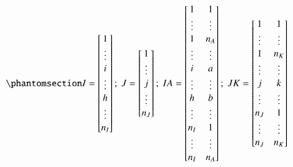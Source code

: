 \documentclass[
  authoryear,
  review,
  1p]{elsarticle}
\begin{document}
\begin{equation}\phantomsection\label{eq-mat11}{
I = \begin{bmatrix}
1 \\
\vdots \\
i \\
\vdots \\
h \\
\vdots \\
n_{I}
\end{bmatrix} ; \;
J = \begin{bmatrix}
1 \\
\vdots \\
j \\
\vdots \\
n_{J}
\end{bmatrix} ; \;
IA = \begin{bmatrix}
1 & 1 \\
\vdots & \vdots \\
1 & n_{A} \\
\vdots & \vdots \\
i & a \\
\vdots & \vdots \\
h & b \\
\vdots & \vdots \\
n_{I} & 1 \\
\vdots & \vdots \\
n_{I} & n_{A}
\end{bmatrix} ; \;
JK = \begin{bmatrix}
1 & 1 \\
\vdots & \vdots \\
1 & n_{K} \\
\vdots & \vdots \\
j & k \\
\vdots & \vdots \\
n_{J} & 1 \\
\vdots & \vdots \\
n_{J} & n_{K}
\end{bmatrix}
}\end{equation}
\end{document}
